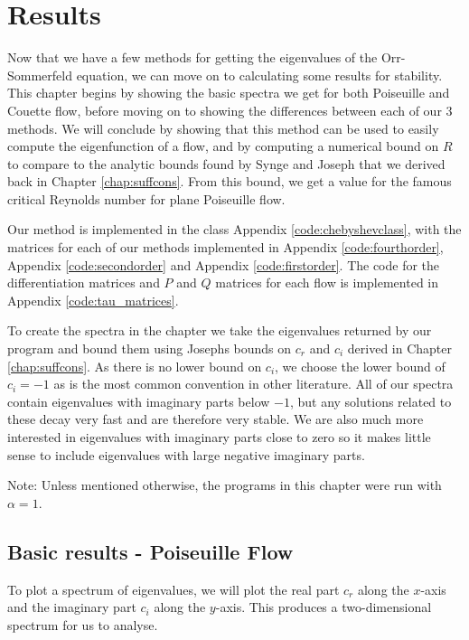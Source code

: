 \chapter{Results}
\label{chap:results}

Now that we have a few methods for getting the eigenvalues of the Orr-Sommerfeld equation, we can move on to calculating some results for stability. This chapter begins by showing the basic spectra we get for both Poiseuille and Couette flow, before moving on to showing the differences between each of our $ 3$ methods. We will conclude by showing that this method can be used to easily compute the eigenfunction of a flow, and by computing a numerical bound on $ R$ to compare to the analytic bounds found by Synge and Joseph that we derived back in Chapter \ref{chap:suffcons}. From this bound, we get a value for the famous critical Reynolds number for plane Poiseuille flow.

Our method is implemented in the class Appendix \ref{code:chebyshevclass}, with the matrices for each of our methods implemented in Appendix \ref{code:fourthorder}, Appendix \ref{code:secondorder} and Appendix \ref{code:firstorder}. The code for the differentiation matrices and $ P $ and $ Q $ matrices for each flow is implemented in Appendix \ref{code:tau_matrices}.

To create the spectra in the chapter we take the eigenvalues returned by our program and bound them using Josephs bounds on $ c_r$ and $ c_i$ derived in Chapter \ref{chap:suffcons}. As there is no lower bound on $ c_i$, we choose the lower bound of $ c_i = -1 $ as is the most common convention in other literature. All of our spectra contain eigenvalues with imaginary parts below $ -1 $, but any solutions related to these decay very fast and are therefore very stable. We are also much more interested in eigenvalues with imaginary parts close to zero so it makes little sense to include eigenvalues with large negative imaginary parts.

Note: Unless mentioned otherwise, the programs in this chapter were run with $ \alpha = 1$.

\section{Basic results - Poiseuille Flow}

To plot a spectrum of eigenvalues, we will plot the real part $c_r$ along the $x$-axis and the imaginary part $c_i$ along the $y$-axis. This produces a two-dimensional spectrum for us to analyse.

